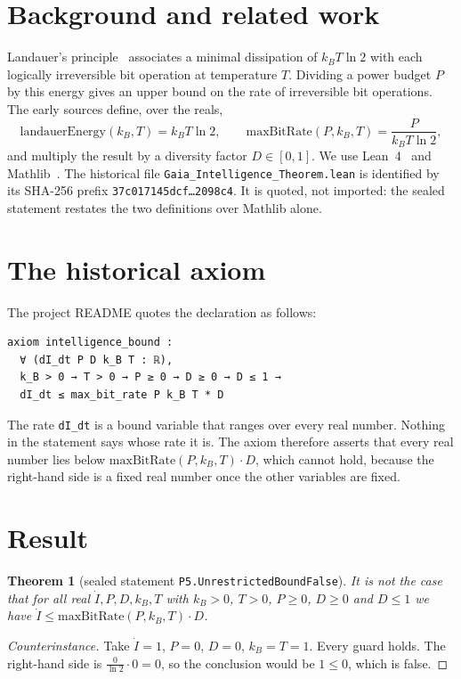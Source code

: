 \documentclass[11pt]{article}
\newtheorem{theorem}{Theorem}
\theoremstyle{remark}
\begin{document}
\section{Background and related work}
Landauer's principle~\citep{landauer1961} associates a minimal dissipation of $k_B T\ln 2$ with
each logically irreversible bit operation at temperature $T$. Dividing a power budget $P$ by this
energy gives an upper bound on the rate of irreversible bit operations. The early sources define,
over the reals,
\[
  \mathrm{landauerEnergy}(k_B,T)=k_B T\ln 2,\qquad
  \mathrm{maxBitRate}(P,k_B,T)=\frac{P}{k_B T\ln 2},
\]
and multiply the result by a diversity factor $D\in[0,1]$. We use Lean~4~\citep{lean4} and
Mathlib~\citep{mathlib2020}. The historical file \texttt{Gaia\_Intelligence\_Theorem.lean} is
identified by its SHA-256 prefix \texttt{37c017145dcf\ldots2098c4}. It is quoted, not imported:
the sealed statement restates the two definitions over Mathlib alone.

\section{The historical axiom}
The project README quotes the declaration as follows:
\begin{lstlisting}
axiom intelligence_bound :
  ∀ (dI_dt P D k_B T : ℝ),
  k_B > 0 → T > 0 → P ≥ 0 → D ≥ 0 → D ≤ 1 →
  dI_dt ≤ max_bit_rate P k_B T * D
\end{lstlisting}
The rate \texttt{dI\_dt} is a bound variable that ranges over every real number. Nothing in the
statement says whose rate it is. The axiom therefore asserts that every real number lies below
$\mathrm{maxBitRate}(P,k_B,T)\cdot D$, which cannot hold, because the right-hand side is a fixed
real number once the other variables are fixed.

\section{Result}
\begin{theorem}[sealed statement \texttt{P5.UnrestrictedBoundFalse}]\label{thm:main}
It is not the case that for all real $\dot I,P,D,k_B,T$ with $k_B>0$, $T>0$, $P\ge0$, $D\ge0$
and $D\le1$ we have $\dot I\le\mathrm{maxBitRate}(P,k_B,T)\cdot D$.
\end{theorem}
\begin{proof}[Counterinstance]
Take $\dot I=1$, $P=0$, $D=0$, $k_B=T=1$. Every guard holds. The right-hand side is
$\frac{0}{\ln 2}\cdot 0=0$, so the conclusion would be $1\le0$, which is false.
\end{proof}
\end{document}
